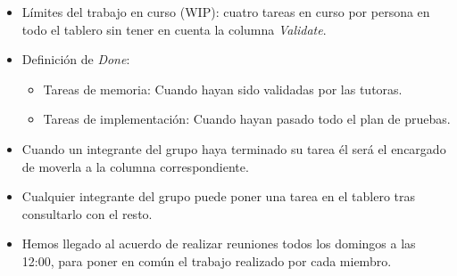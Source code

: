 \begin{itemize}
    \item Límites del trabajo en curso (WIP): cuatro tareas en curso por persona en todo el tablero sin tener en cuenta la columna \textit{Validate}.
    \item Definición de \textit{Done}:
          \begin{itemize}
              \item Tareas de memoria: Cuando hayan sido validadas por las tutoras.
              \item Tareas de implementación: Cuando hayan pasado todo el plan de pruebas.
          \end{itemize}
    \item Cuando un integrante del grupo haya terminado su tarea él será el encargado de moverla a la columna correspondiente.
    \item Cualquier integrante del grupo puede poner una tarea en el tablero tras consultarlo con el resto.
    \item Hemos llegado al acuerdo de realizar reuniones todos los domingos a las 12:00, para poner en común el trabajo realizado por cada miembro.
\end{itemize}

